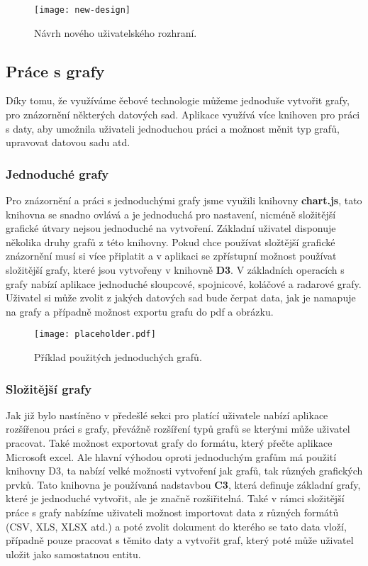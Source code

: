 \begin{figure}[htp]
  \centering
  \texttt{[image: new-design]}
  \caption{Návrh nového uživatelského rozhraní.}
  \label{new-ui}
\end{figure}

\subsection{Práce s grafy}
\par Díky tomu, že využíváme ěebové technologie můžeme jednoduše vytvořit grafy, pro znázornění některých datových sad. Aplikace využívá více knihoven pro práci s daty, aby umožnila uživateli jednoduchou práci a možnost měnit typ grafů, upravovat datovou sadu atd.

\subsubsection{Jednoduché grafy}
\par Pro znázornění a práci s jednoduchými grafy jsme využili knihovny \textbf{chart.js}, tato knihovna se snadno ovlává a je jednoduchá pro nastavení, nicméně složitější grafické útvary nejsou jednoduché na vytvoření. Základní uživatel disponuje několika druhy grafů z této knihovny. Pokud chce používat složtější grafické znázornění musí si více připlatit a v aplikaci se zpřístupní možnost používat složitější grafy, které jsou vytvořeny v knihovně \textbf{D3}. V základních operacích s grafy nabízí aplikace jednoduché sloupcové, spojnicové, koláčové a radarové grafy. Uživatel si může zvolit z jakých datových sad bude čerpat data, jak je namapuje na grafy a případně možnost exportu grafu do pdf a obrázku.

\begin{figure}[!htb]
  \centering
  \texttt{[image: placeholder.pdf]}
  \caption{Příklad použitých jednoduchých grafů.}
  \label{binarni-strom}
\end{figure}

\subsubsection{Složitější grafy}
\par Jak již bylo nastíněno v předešlé sekci pro platící uživatele nabízí aplikace rozšířenou práci s grafy, převážně rozšíření typů grafů se kterými může uživatel pracovat. Také možnost exportovat grafy do formátu, který přečte aplikace Microsoft excel. Ale hlavní výhodou oproti jednoduchým grafům má použití knihovny D3, ta nabízí velké možnosti vytvoření jak grafů, tak různých grafických prvků. Tato knihovna je používaná nadstavbou \textbf{C3}, která definuje základní grafy, které je jednoduché vytvořit, ale je značně rozšiřitelná. Také v rámci složitější práce s grafy nabízíme uživateli možnost importovat data z různých formátů (CSV, XLS, XLSX atd.) a poté zvolit dokument do kterého se tato data vloží, případně pouze pracovat s těmito daty a vytvořit graf, který poté může uživatel uložit jako samostatnou entitu.


